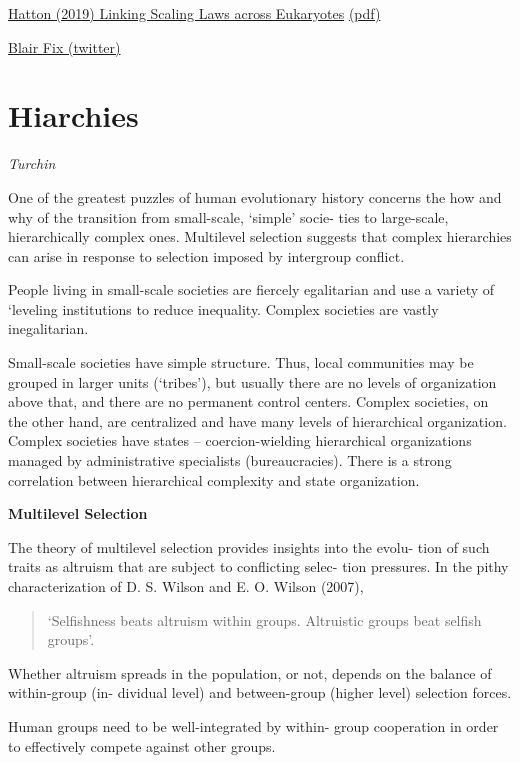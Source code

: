 \documentclass[
]{book}
\begin{document}
\href{https://www.pnas.org/content/116/43/21616}{Hatton (2019) Linking Scaling Laws across Eukaryotes}
\href{pdf/Hatton_2019_Linking_Scaling_Laws_across_Eukaryotes.pdf}{(pdf)}

\href{https://twitter.com/blair_fix/status/1370181497097908225/photo/1}{Blair Fix (twitter)}

\hypertarget{hiarchies}{%
\section{Hiarchies}\label{hiarchies}}

\emph{Turchin}

One of the greatest puzzles of human evolutionary history concerns
the how and why of the transition from small-scale, `simple' socie-
ties to large-scale, hierarchically complex ones.
Multilevel selection suggests that complex hierarchies can arise in
response to selection imposed by intergroup conflict.

People living in small-scale societies are fiercely egalitarian and
use a variety of `leveling institutions to reduce inequality.
Complex societies are vastly inegalitarian.

Small-scale societies have simple
structure. Thus, local communities may be grouped in larger units
(`tribes'), but usually there are no levels of organization above that,
and there are no permanent control centers. Complex societies, on
the other hand, are centralized and have many levels of hierarchical
organization.
Complex societies have states -- coercion-wielding hierarchical organizations
managed by administrative specialists (bureaucracies).
There is a strong correlation between hierarchical complexity and state organization.

\textbf{Multilevel Selection}

The theory of multilevel selection provides insights into the evolu-
tion of such traits as altruism that are subject to conflicting selec-
tion pressures. In the pithy characterization of D. S. Wilson and
E. O. Wilson (2007),

\begin{quote}
`Selfishness beats altruism within groups.
Altruistic groups beat selfish groups'.
\end{quote}

Whether altruism spreads in
the population, or not, depends on the balance of within-group (in-
dividual level) and between-group (higher level) selection forces.

Human groups need to be well-integrated by within-
group cooperation in order to effectively compete against other
groups.
\end{document}
